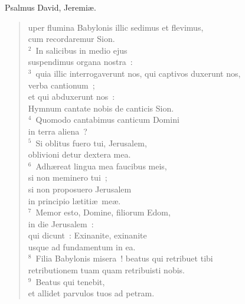 \bchapter[Psalm]
Psalmus David, Jeremi\ae . \begin{verse}uper flumina Babylonis illic sedimus et flevimus,\\ cum recordaremur Sion.\\
${}^{2}$~In salicibus in medio ejus\\ suspendimus organa nostra~:\\
${}^{3}$~quia illic interrogaverunt nos, qui captivos duxerunt nos,\\ verba cantionum~;\\ et qui abduxerunt nos~:\\ Hymnum cantate nobis de canticis Sion.\\
${}^{4}$~Quomodo cantabimus canticum Domini\\ in terra aliena~?\\
${}^{5}$~Si oblitus fuero tui, Jerusalem,\\ oblivioni detur dextera mea.\\
${}^{6}$~Adh\ae reat lingua mea faucibus meis,\\ si non meminero tui~;\\ si non proposuero Jerusalem\\ in principio l\ae titi\ae\ me\ae .\\
${}^{7}$~Memor esto, Domine, filiorum Edom,\\ in die Jerusalem~:\\ qui dicunt~: Exinanite, exinanite\\ usque ad fundamentum in ea.\\
${}^{8}$~Filia Babylonis misera~! beatus qui retribuet tibi\\ retributionem tuam quam retribuisti nobis.\\
${}^{9}$~Beatus qui tenebit,\\ et allidet parvulos tuos ad petram.\end{verse}



